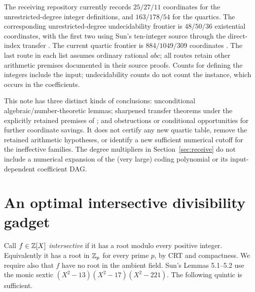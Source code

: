\documentclass[11pt]{article}
\begin{document}
The receiving repository \cite{repo} currently records $25/27/11$
coordinates for the unrestricted-degree integer definitions, and
$163/178/54$ for the quartics. The corresponding unrestricted-degree
undecidability frontier is $48/50/36$ existential coordinates, with the
first two using Sun's ten-integer source through the direct-index transfer
\cite{index}. The current quartic frontier is $884/1049/309$ coordinates
\cite{v124}. The last route in each list assumes ordinary rational $abc$;
all routes retain other arithmetic premises documented in their source
proofs. Counts for defining the integers include the input; undecidability
counts do not count the instance, which occurs in the coefficients.

This note has three distinct kinds of conclusions: unconditional
algebraic/number-theoretic lemmas; sharpened transfer theorems under the
explicitly retained premises of \cite{index}; and obstructions or
conditional opportunities for further coordinate savings. It does not
certify any new quartic table, remove the retained arithmetic hypotheses,
or identify a new sufficient numerical cutoff for the ineffective families.
The degree multipliers in Section~\ref{sec:receive} do not include a numerical
expansion of the (very large) coding polynomial or its input-dependent
coefficient DAG.

\section{An optimal intersective divisibility gadget}\label{sec:quintic}
Call $f\in\mathbb Z[X]$ \emph{intersective} if it has a root modulo every positive
integer. Equivalently it has a root in $\mathbb Z_p$ for every prime $p$, by CRT
and compactness. We require also that $f$ have no root in the ambient
field. Sun's Lemmas 5.1--5.2 use the monic sextic
$(X^2-13)(X^2-17)(X^2-221)$. The following quintic is sufficient.
\end{document}
